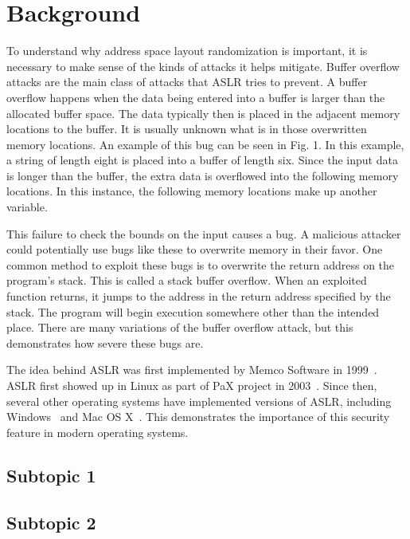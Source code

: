 \section{Background}
\label{s:background} %

To understand why address space layout randomization is important, it is necessary to make sense of the kinds of attacks it helps mitigate. Buffer overflow attacks are the main class of attacks that ASLR tries to prevent. A buffer overflow happens when the data being entered into a buffer is larger than the allocated buffer space. The data typically then is placed in the adjacent memory locations to the buffer. It is usually unknown what is in those overwritten memory locations. An example of this bug can be seen in Fig. 1. In this example, a string of length eight is placed into a buffer of length six. Since the input data is longer than the buffer, the extra data is overflowed into the following memory locations. In this instance, the following memory locations make up another variable.

This failure to check the bounds on the input causes a bug. A malicious attacker could potentially use bugs like these to overwrite memory in their favor. One common method to exploit these bugs is to overwrite the return address on the program’s stack. This is called a stack buffer overflow. When an exploited function returns, it jumps to the address in the return address specified by the stack. The program will begin execution somewhere other than the intended place. There are many variations of the buffer overflow attack, but this demonstrates how severe these bugs are.

The idea behind ASLR was first implemented by Memco Software in 1999~\cite{yarom1999method}. ASLR first showed up in Linux as part of PaX project in 2003~\cite{paxdocs}. Since then, several other operating systems have implemented versions of ASLR, including Windows~\cite{msexploitmitigation} and Mac OS X~\cite{applesecurity}. This demonstrates the importance of this security feature in modern operating systems.


\subsection{Subtopic 1}
\lipsum[4]

\subsection{Subtopic 2}
\lipsum[5]
